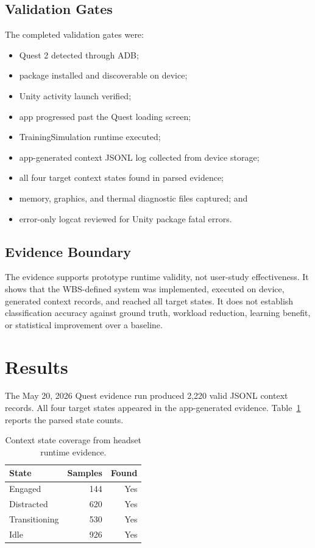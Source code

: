 \documentclass[conference]{IEEEtran}
\begin{document}
\subsection{Validation Gates}
The completed validation gates were:
\begin{itemize}
\item Quest 2 detected through ADB;
\item package installed and discoverable on device;
\item Unity activity launch verified;
\item app progressed past the Quest loading screen;
\item TrainingSimulation runtime executed;
\item app-generated context JSONL log collected from device storage;
\item all four target context states found in parsed evidence;
\item memory, graphics, and thermal diagnostic files captured; and
\item error-only logcat reviewed for Unity package fatal errors.
\end{itemize}

\subsection{Evidence Boundary}
The evidence supports prototype runtime validity, not user-study effectiveness. It shows that the WBS-defined system was implemented, executed on device, generated context records, and reached all target states. It does not establish classification accuracy against ground truth, workload reduction, learning benefit, or statistical improvement over a baseline.

\section{Results}
The May 20, 2026 Quest evidence run produced 2,220 valid JSONL context records. All four target states appeared in the app-generated evidence. Table~\ref{tab:statecoverage} reports the parsed state counts.

\begin{table}[t]
\centering
\caption{Context state coverage from headset runtime evidence.}
\label{tab:statecoverage}
\begin{tabular}{lrr}
\toprule
State & Samples & Found \\
\midrule
Engaged & 144 & Yes \\
Distracted & 620 & Yes \\
Transitioning & 530 & Yes \\
Idle & 926 & Yes \\
\bottomrule
\end{tabular}
\end{table}
\end{document}
